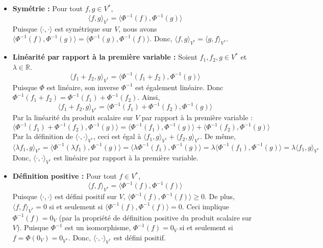 \documentclass[11pt,a4paper]{report}
\begin{document}
\begin{enumerate}
  \begin{itemize}
  \item
    \textbf{Symétrie :} Pour tout \(f, g \in V^*\),
    \[ \langle f, g \rangle_{V^*} = \langle \Phi^{-1}(f), \Phi^{-1}(g) \rangle \]
    Puisque \(\langle \cdot, \cdot \rangle\) est symétrique sur \(V\),
    nous avons
    \(\langle \Phi^{-1}(f), \Phi^{-1}(g) \rangle = \langle \Phi^{-1}(g), \Phi^{-1}(f) \rangle\).
    Donc, \(\langle f, g \rangle_{V^*} = \langle g, f \rangle_{V^*}\).
  \item
    \textbf{Linéarité par rapport à la première variable :} Soient
    \(f_1, f_2, g \in V^*\) et \(\lambda \in \mathbb{R}\).
    \[ \langle f_1 + f_2, g \rangle_{V^*} = \langle \Phi^{-1}(f_1 + f_2), \Phi^{-1}(g) \rangle \]
    Puisque \(\Phi\) est linéaire, son inverse \(\Phi^{-1}\) est
    également linéaire. Donc
    \(\Phi^{-1}(f_1 + f_2) = \Phi^{-1}(f_1) + \Phi^{-1}(f_2)\). Ainsi,
    \[ \langle f_1 + f_2, g \rangle_{V^*} = \langle \Phi^{-1}(f_1) + \Phi^{-1}(f_2), \Phi^{-1}(g) \rangle \]
    Par la linéarité du produit scalaire sur \(V\) par rapport à la
    première variable :
    \[ \langle \Phi^{-1}(f_1) + \Phi^{-1}(f_2), \Phi^{-1}(g) \rangle = \langle \Phi^{-1}(f_1), \Phi^{-1}(g) \rangle + \langle \Phi^{-1}(f_2), \Phi^{-1}(g) \rangle \]
    Par la définition de \(\langle \cdot, \cdot \rangle_{V^*}\), ceci
    est égal à
    \(\langle f_1, g \rangle_{V^*} + \langle f_2, g \rangle_{V^*}\). De
    même,
    \[ \langle \lambda f_1, g \rangle_{V^*} = \langle \Phi^{-1}(\lambda f_1), \Phi^{-1}(g) \rangle = \langle \lambda \Phi^{-1}(f_1), \Phi^{-1}(g) \rangle = \lambda \langle \Phi^{-1}(f_1), \Phi^{-1}(g) \rangle = \lambda \langle f_1, g \rangle_{V^*} \]
    Donc, \(\langle \cdot, \cdot \rangle_{V^*}\) est linéaire par
    rapport à la première variable.
  \item
    \textbf{Définition positive :} Pour tout \(f \in V^*\),
    \[ \langle f, f \rangle_{V^*} = \langle \Phi^{-1}(f), \Phi^{-1}(f) \rangle \]
    Puisque \(\langle \cdot, \cdot \rangle\) est défini positif sur
    \(V\), \(\langle \Phi^{-1}(f), \Phi^{-1}(f) \rangle \ge 0\). De
    plus, \(\langle f, f \rangle_{V^*} = 0\) si et seulement si
    \(\langle \Phi^{-1}(f), \Phi^{-1}(f) \rangle = 0\). Ceci implique
    \(\Phi^{-1}(f) = 0_V\) (par la propriété de définition positive du
    produit scalaire sur \(V\)). Puisque \(\Phi^{-1}\) est un
    isomorphisme, \(\Phi^{-1}(f) = 0_V\) si et seulement si
    \(f = \Phi(0_V) = 0_{V^*}\). Donc,
    \(\langle \cdot, \cdot \rangle_{V^*}\) est défini positif.
  \end{itemize}


\end{enumerate}
\end{document}
